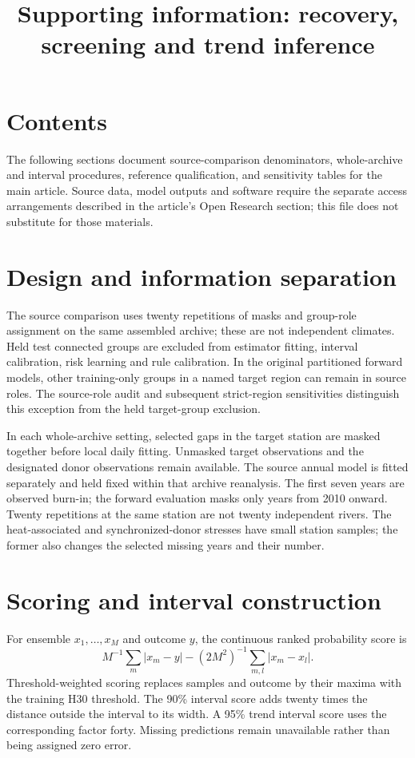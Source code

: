 \documentclass[draft]{agujournal2025}
\begin{document}
\title{Supporting information: recovery, screening and trend inference}
\maketitle\par
\section*{Contents}
The following sections document source-comparison denominators, whole-archive and interval procedures, reference qualification, and sensitivity tables for the main article. Source data, model outputs and software require the separate access arrangements described in the article's Open Research section; this file does not substitute for those materials.

\section{Design and information separation}
The source comparison uses twenty repetitions of masks and group-role assignment on the same assembled archive; these are not independent climates. Held test connected groups are excluded from estimator fitting, interval calibration, risk learning and rule calibration. In the original partitioned forward models, other training-only groups in a named target region can remain in source roles. The source-role audit and subsequent strict-region sensitivities distinguish this exception from the held target-group exclusion.

In each whole-archive setting, selected gaps in the target station are masked together before local daily fitting. Unmasked target observations and the designated donor observations remain available. The source annual model is fitted separately and held fixed within that archive reanalysis. The first seven years are observed burn-in; the forward evaluation masks only years from 2010 onward. Twenty repetitions at the same station are not twenty independent rivers. The heat-associated and synchronized-donor stresses have small station samples; the former also changes the selected missing years and their number.

\section{Scoring and interval construction}
For ensemble $x_1,\ldots,x_M$ and outcome $y$, the continuous ranked probability score is
\[ M^{-1}\sum_m|x_m-y|-(2M^2)^{-1}\sum_{m,l}|x_m-x_l|. \]
Threshold-weighted scoring replaces samples and outcome by their maxima with the training H30 threshold. The 90\% interval score adds twenty times the distance outside the interval to its width. A 95\% trend interval score uses the corresponding factor forty. Missing predictions remain unavailable rather than being assigned zero error.
\end{document}
